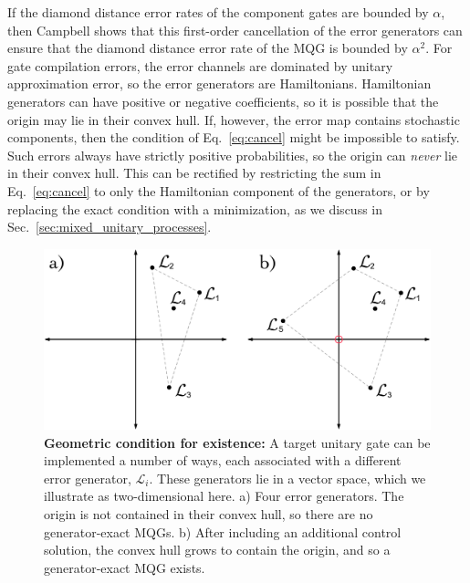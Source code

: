 \documentclass[aps,nofootinbib,pra,notitlepage,twocolumn]{revtex4-1}
\newcommand{\genmat}{\ensuremath{{\mathcal{L}}}}
\newcommand{\0}{\ensuremath{\mathbf{0}}}
\begin{document}
If the diamond distance error rates of the component gates are bounded by $\alpha$, then Campbell shows that this first-order cancellation of the error generators can ensure that the diamond distance error rate of the MQG is bounded by $\alpha^2$. For gate compilation errors, the error channels are dominated by unitary approximation error, so the error generators are Hamiltonians. Hamiltonian generators can have positive or negative coefficients, so it is possible that the origin may lie in their convex hull. If, however, the error map contains stochastic components, then the condition of Eq.~\eqref{eq:cancel} might be impossible to satisfy. Such errors always have strictly positive probabilities, so the origin can \emph{never} lie in their convex hull. This can be rectified by restricting the sum in Eq.~\eqref{eq:cancel} to only the Hamiltonian component of the generators, or by replacing the exact condition with a minimization, as we discuss in Sec.~\ref{sec:mixed_unitary_processes}. 

\begin{figure}
  \centering
  \includegraphics[width=\columnwidth]{vectorspace.pdf}
  \caption{\textbf{Geometric condition for existence:} A target unitary gate can be implemented a number of ways, each associated with a different error generator, $\genmat_i$. These generators lie in a vector space, which we illustrate as two-dimensional here. a) Four error generators. The origin is not contained in their convex hull, so there are no generator-exact MQGs. b) After including an additional control solution, the convex hull grows to contain the origin, and so a generator-exact MQG exists. }
  \label{fig:vectorspace}
\end{figure}
\end{document}
